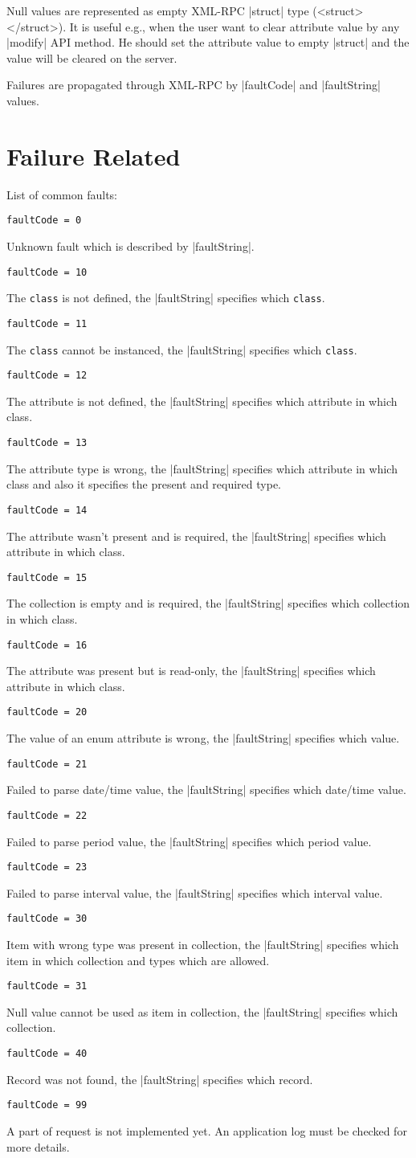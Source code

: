 \documentclass[a4paper]{report}
\newcommand{\ApiCode}[1]{\lstinline[style=styleApi]|#1|}
\newcommand{\ApiValue}[1]{\verb|#1|}
\newcommand{\ApiItem}[1]{\item #1 %

}
\newenvironment{ApiFailures}{\begin{compactitem}}{\end{compactitem}}
\newcommand{\ApiFailure}[1]{\ApiItem{\ApiCode{faultCode = #1}}}
\begin{document}
\begin{compactitem}
\item Null values are represented as empty XML-RPC |struct| type (<struct></struct>). It is useful e.g., when the user want to clear attribute value by any |modify| API method. He should set the attribute value to empty |struct| and the value will be cleared on the server.

\item Failures are propagated through XML-RPC by |faultCode| and |faultString| values.

\end{compactitem}


\section{Failure Related}

List of common faults:

\begin{ApiFailures}

\ApiFailure{0} Unknown fault which is described by |faultString|.

\ApiFailure{10} The \ApiValue{class} is not defined, the |faultString| specifies which \ApiValue{class}.
\ApiFailure{11} The \ApiValue{class} cannot be instanced, the |faultString| specifies which \ApiValue{class}.
\ApiFailure{12} The attribute is not defined, the |faultString| specifies which attribute in which class.
\ApiFailure{13} The attribute type is wrong, the |faultString| specifies which attribute in which class and also it specifies the present and required type.
\ApiFailure{14} The attribute wasn't present and is required, the |faultString| specifies which attribute in which class.
\ApiFailure{15} The collection is empty and is required, the |faultString| specifies which collection in which class.
\ApiFailure{16} The attribute was present but is read-only, the |faultString| specifies which attribute in which class.

\ApiFailure{20} The value of an enum attribute is wrong, the |faultString| specifies which value.
\ApiFailure{21} Failed to parse date/time value, the |faultString| specifies which date/time value.
\ApiFailure{22} Failed to parse period value, the |faultString| specifies which period value.
\ApiFailure{23} Failed to parse interval value, the |faultString| specifies which interval value.

\ApiFailure{30} Item with wrong type was present in collection, the |faultString| specifies which item in which collection and types which are allowed.
\ApiFailure{31} Null value cannot be used as item in collection, the |faultString| specifies which collection.

\ApiFailure{40} Record was not found, the |faultString| specifies which record.

\ApiFailure{99} A part of request is not implemented yet. An application log must be checked for more details.

\end{ApiFailures}                
                
\end{document}
